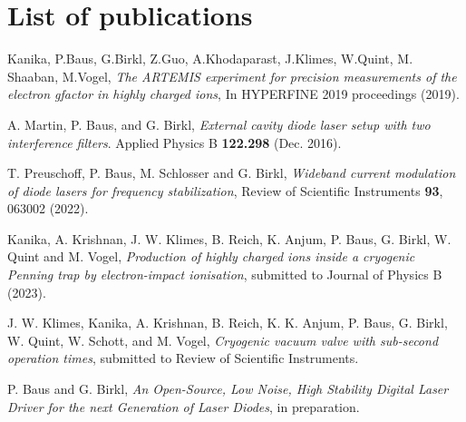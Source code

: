 \documentclass[12pt]{book}
\begin{document}
\chapter*{List of publications}

Kanika, P.Baus, G.Birkl, Z.Guo, A.Khodaparast, J.Klimes, W.Quint, M. Shaaban, M.Vogel, \textit{The ARTEMIS experiment for precision measurements of the electron gfactor in highly charged ions}, In HYPERFINE 2019 proceedings (2019).\par\vspace{12pt}

A. Martin, P. Baus, and G. Birkl, \textit{External cavity diode laser setup
with two interference filters}. Applied Physics B \textbf{122.298} (Dec. 2016).\par\vspace{12pt}

T. Preuschoff, P. Baus, M. Schlosser and G. Birkl, \textit{Wideband current modulation of diode lasers for frequency stabilization}, Review of Scientific Instruments \textbf{93}, 063002 (2022).\par\vspace{12pt}

Kanika, A. Krishnan, J. W. Klimes, B. Reich, K. Anjum, P. Baus, G. Birkl, W. Quint and M. Vogel, \textit{Production of highly charged ions inside a cryogenic Penning trap by electron-impact ionisation}, submitted to Journal of Physics B (2023).\par\vspace{12pt}

J. W. Klimes, Kanika, A. Krishnan, B. Reich, K. K. Anjum, P. Baus, G. Birkl, W. Quint, W. Schott, and M. Vogel, \textit{Cryogenic vacuum valve with sub-second operation times}, submitted to Review of Scientific Instruments.\par\vspace{12pt}

P. Baus and G. Birkl, \textit{An Open-Source, Low Noise, High Stability Digital Laser Driver for the next
Generation of Laser Diodes}, in preparation.
\end{document}
